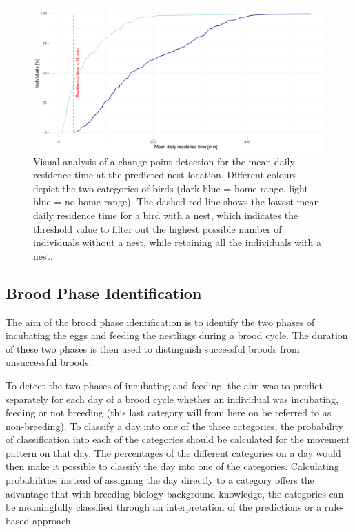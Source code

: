 \begin{figure}[H]
\centering
\includegraphics[width=1\textwidth]{figures/methods/04_residence_time.pdf}
\caption[Change point detection for the mean daily residence time at the predicted nest location]{Visual analysis of a change point detection for the mean daily residence time at the predicted nest location. Different colours depict the two categories of birds (dark blue = home range, light blue = no home range). The dashed red line shows the lowest mean daily residence time for a bird with a nest, which indicates the threshold value to filter out the highest possible number of individuals without a nest, while retaining all the individuals with a nest.}
\label{figure:residence_time_cpd}
\end{figure}



\subsection{Brood Phase Identification} \label{subsection:brood_phase_identification}
The aim of the brood phase identification is to identify the two phases of incubating the eggs and feeding the nestlings during a brood cycle. The duration of these two phases is then used to distinguish successful broods from unsuccessful broods.

To detect the two phases of incubating and feeding, the aim was to predict separately for each day of a brood cycle whether an individual was incubating, feeding or not breeding (this last category will from here on be referred to as non-breeding). To classify a day into one of the three categories, the probability of classification into each of the categories should be calculated for the movement pattern on that day. The percentages of the different categories on a day would then make it possible to classify the day into one of the categories. Calculating probabilities instead of assigning the day directly to a category offers the advantage that with breeding biology background knowledge, the categories can be meaningfully classified through an interpretation of the predictions or a rule-based approach.

